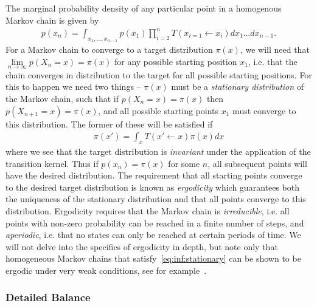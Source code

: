The marginal probability density of any particular point in a homogenous Markov chain is given by
\begin{align}
p(x_n) = \int_{x_1,\dots,x_{n-1}} p(x_1) \prod_{i=2}^{n} T(x_{i=1} \leftarrow x_{i}) dx_1\dots dx_{n-1}.
\end{align}
 For a Markov chain to converge to a target distribution $\pi (x)$, we will need that
$\lim\limits_{n\rightarrow\infty} p(X_n=x) = \pi(x)$ for any possible starting position $x_1$, i.e.
that the chain converges in distribution to the target for all possible starting positions.   For this
to happen we need two things -- $\pi(x)$ must be a \emph{stationary distribution} of the Markov
chain, such that if $p(X_n=x) = \pi(x)$ then $p(X_{n+1}=x) = \pi(x)$, and all possible starting points
$x_1$ must converge to this distribution.  The former of these will be satisfied if 
\begin{align}
\label{eq:inf:stationary}
\pi(x') = \int_{x} T(x' \leftarrow x) \pi(x)dx
\end{align}
where we see that the target distribution is \emph{invariant} under the application of the transition kernel.
Thus if $p(x_n)=\pi(x)$ for some $n$, all subsequent points will have the desired distribution.
The requirement that all starting points converge to the desired target distribution is known
as \emph{ergodicity} which guarantees both the uniqueness of the stationary distribution
and that all points converge to this distribution.  Ergodicity requires that the Markov chain is
\emph{irreducible}, i.e. all points with non-zero probability can be reached in a finite number
of steps, and \emph{aperiodic}, i.e. that no states can only be reached at certain periods of 
time.   We will not delve into the specifics of ergodicity in depth, but note only that homogeneous
Markov chains that satisfy~\eqref{eq:inf:stationary} can be shown to be ergodic under very weak
conditions, see for example~\cite{neal1993probabilistic,tierney1994markov}.

\subsubsection{Detailed Balance}
\label{sec:inf:foundation:mcmc:db}

